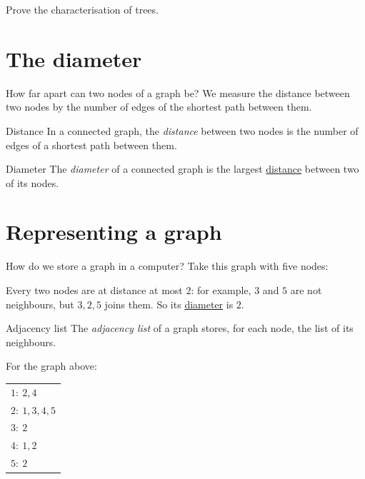 \documentclass[a4paper,12pt,oneside]{report}
\begin{document}
\begin{todobox}Prove the characterisation of trees.\end{todobox}

\section{The diameter}
\label{sec:diameter}

How far apart can two nodes of a graph be? We measure the distance
between two nodes by the number of edges of the shortest path between
them.

\begin{frameddefn}{Distance}\label{def:distance}
In a connected graph, the \emph{distance} between two nodes is the
number of edges of a shortest path between them.
\end{frameddefn}

\begin{frameddefn}{Diameter}\label{def:diameter}
The \emph{diameter} of a connected graph is the largest
\hyperref[def:distance]{distance} between two of its nodes.
\end{frameddefn}

\section{Representing a graph}
\label{sec:graph-representation}

How do we store a graph in a computer? Take this graph with five
nodes:
\begin{center}
\end{center}
Every two nodes are at distance at most $2$: for example, $3$ and $5$
are not neighbours, but $3,2,5$ joins them. So its
\hyperref[def:diameter]{diameter} is $2$.

\begin{frameddefn}{Adjacency list}\label{def:adjacency-list}
The \emph{adjacency list} of a graph stores, for each node, the list
of its neighbours.
\end{frameddefn}

For the graph above:
\begin{center}
\begin{tabular}{l}
$1:\ 2,4$\\
$2:\ 1,3,4,5$\\
$3:\ 2$\\
$4:\ 1,2$\\
$5:\ 2$
\end{tabular}
\end{center}
\end{document}
